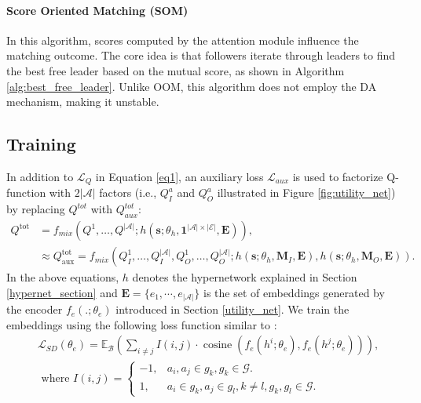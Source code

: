 \documentclass[10pt]{article} %
\begin{document}
\paragraph{Score Oriented Matching (SOM)}
In this algorithm, scores computed by the attention module influence the matching outcome. The core idea is that followers iterate through leaders to find the best free leader based on the mutual score, as shown in Algorithm \ref{alg:best_free_leader}. Unlike OOM, this algorithm does not employ the DA mechanism, making it unstable.

\subsection{Training} \label{training_section}
In addition to $\mathcal{L}_{Q}$ in Equation \ref{eq1}, an auxiliary loss $\mathcal{L}_{\textit{aux}}$ is used to factorize Q-function with $2|\mathcal{A}|$ factors (i.e., $Q_I^a$ and $Q_O^a$ illustrated in Figure \ref{fig:utility_net}) by replacing $Q^{\textit{tot}}$ with $Q^{tot}_{\textit{aux}}$:
\begin{align}
Q^{\mathrm{tot}} &=f_{\textit{mix}}\left(Q^1, \ldots, Q^{|\mathcal{A}|} ; h\left(\mathbf{s} ; \theta_h, \mathbf{1}^{|\mathcal{A}| \times |\mathcal{E}|}, \boldsymbol{E}\right)\right), \label{eq2} \\
&\approx Q_{\mathrm{aux}}^{\mathrm{tot}}=f_{\textit{mix}}\left(Q_I^1, \ldots, Q_I^{|\mathcal{A}|}, Q_O^1, \ldots, Q_O^{|\mathcal{A}|}\right. ;
\left.h\left(\mathbf{s} ; \theta_h, \boldsymbol{M}_I, \boldsymbol{E}\right), h\left(\mathbf{s} ; \theta_h, \boldsymbol{M}_O, \boldsymbol{E}\right)\right). \label{eq3}
\end{align}
In the above equations, $h$ denotes the hypernetwork explained in Section \ref{hypernet_section} and $\boldsymbol{E} = \{ e_1, \cdots, e_{|\mathcal{A}|} \}$ is the set of embeddings generated by the encoder $f_e(.;\theta_e)$ introduced in Section \ref{utility_net}. We train the embeddings using the following loss function similar to \citep{zang2024automatic}:
\begin{align} \label{eq4}
& \mathcal{L}_{S D}\left(\theta_e\right)=\mathbb{E}_{\mathcal{B}}\left(\sum_{i \neq j} I(i, j) \cdot \operatorname{cosine}\left(f_e\left(h^i ; \theta_e\right), f_e\left(h^j ; \theta_e\right)\right)\right), \\
& \text { where } I(i, j)= \begin{cases}-1, & a_i, a_j \in g_k, g_k \in \mathcal{G} . \\
1, & a_i \in g_k, a_j \in g_l, k \neq l, g_k,g_l \in \mathcal{G} .
\end{cases} \nonumber
\end{align}
\end{document}
